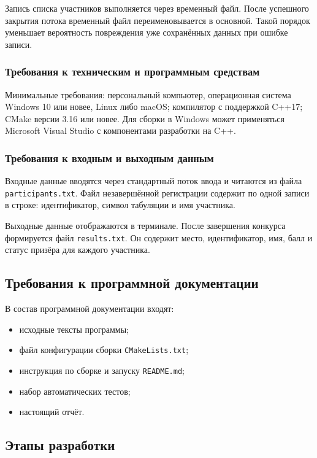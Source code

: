 \documentclass[14pt,a4paper]{extarticle}
\newcommand{\code}[1]{\texttt{#1}}
\begin{document}
Запись списка участников выполняется через временный файл. После успешного закрытия потока временный файл переименовывается в основной. Такой порядок уменьшает вероятность повреждения уже сохранённых данных при ошибке записи.

\subsubsection{Требования к техническим и программным средствам}

Минимальные требования: персональный компьютер, операционная система Windows 10 или новее, Linux либо macOS; компилятор с поддержкой C++17; CMake версии 3.16 или новее. Для сборки в Windows может применяться Microsoft Visual Studio с компонентами разработки на C++.

\subsubsection{Требования к входным и выходным данным}

Входные данные вводятся через стандартный поток ввода и читаются из файла \code{participants.txt}. Файл незавершённой регистрации содержит по одной записи в строке: идентификатор, символ табуляции и имя участника.

Выходные данные отображаются в терминале. После завершения конкурса формируется файл \code{results.txt}. Он содержит место, идентификатор, имя, балл и статус призёра для каждого участника.

\subsection{Требования к программной документации}

В состав программной документации входят:
\begin{itemize}
\item исходные тексты программы;
\item файл конфигурации сборки \code{CMakeLists.txt};
\item инструкция по сборке и запуску \code{README.md};
\item набор автоматических тестов;
\item настоящий отчёт.
\end{itemize}

\subsection{Этапы разработки}
\end{document}
